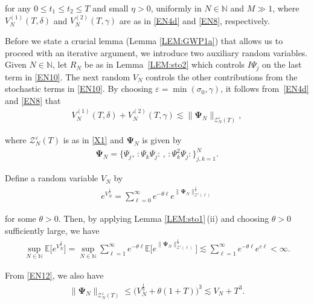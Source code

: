 \documentclass[letterpaper, 11pt,  reqno]{amsart}
\newcommand{\1}{\hspace{0.5mm}\text{I}\hspace{0.2mm}}
\newcommand{\noi}{\noindent}
\newcommand{\N}{\mathbb{N}}
\newcommand{\E}{\mathbb{E}}
\newcommand{\ta}{\theta}
\newcommand{\s}{\sigma}
\newcommand{\eps}{\varepsilon}
\newcommand{\dl}{\delta}
\newcommand{\les}{\lesssim}
\newcommand{\g}{\gamma}
\newcommand{\ZZ}{\mathcal{Z}}
\newcommand{\wick}[1]{:\!{#1}\!:}
\renewcommand{\l}{\ell}
\numberwithin{equation}{section}
\numberwithin{theorem}{section}
\begin{document}
\noi 
for any $0\leq t_1 \leq t_2 \leq T$
and small $\eta > 0$, 
uniformly in $N \in \N$ and $M \gg1$, 
where $V_N^{(1)} (T, \dl)$ and 
$V_N^{(2)} (T, \g)$
are as in \eqref{EN4d} and \eqref{EN8}, respectively.











Before we state a crucial lemma (Lemma \ref{LEM:GWP1a})
that allows us to proceed with an iterative argument, 
we introduce two auxiliary random variables.
Given $N \in \N$, let $R_N$ be as in Lemma~\ref{LEM:sto2}
which controls $I \Psi_j$ on the last term in \eqref{EN10}.
The next random $V_N$ controls
the other 
contributions from the stochastic terms in \eqref{EN10}.
By choosing $\eps = \min(\s_0, \g)$, 
it follows from~\eqref{EN4d} and \eqref{EN8}
that 
\begin{align*}
V_N^{(1)} (T, \dl)
+ V_N^{(2)} (T, \g)
\les 
\| \pmb{\Psi}_N\|_{\ZZ_N^\eps(T)}, 
\end{align*}


\noi
where 
$\ZZ_N^\eps(T)$ is as 
in \eqref{X1}
and $\pmb \Psi_N$ is given by 
\begin{align*}
\pmb \Psi_N = \big\{
\Psi_j,  \, \wick{\Psi_k \Psi_j} \, , 
 \, \wick{\Psi_k^2 \Psi_j} \big\}_{j, k = 1}^N.
\end{align*}


\noi
Define a random variable $V_N$ by 
\begin{align}
e^{V_N^\frac{1}{3}}
 = \sum_{\l = 0}^\infty e^{-\ta \l} e^{\| \pmb \Psi_N\|_{\ZZ^\eps(\l)}^\frac{1}{3}}
\label{EN12}
\end{align}

\noi
for some  $\ta > 0$.
Then, by applying 
Lemma \ref{LEM:sto1}\,(ii)
and choosing  $\ta  > 0$ sufficiently large, we have 
\begin{align}
\sup_{N \in \N} \E\Big[ 
e^{V_N^\frac{1}{3}} \Big] 
= 
\sup_{N \in \N}
\sum_{\l = 1}^\infty e^{-\ta \l} \E\Big[e^{\| \pmb \Psi_N\|_{\ZZ^\eps(\l)}^\frac{1}{3}}\Big]
\les \sum_{\l = 1}^\infty e^{-\ta \l} e^{c \l} < \infty.
\label{EN13}
\end{align}


\noi
From \eqref{EN12}, we also have
\begin{align}
 \| \pmb \Psi_N\|_{\ZZ_N^\eps(T)}
\le \Big( V_N^\frac{1}{3} + \ta (1 + T) \Big)^3
\les V_N + T^3.
\label{EN14}
\end{align}
\end{document}

